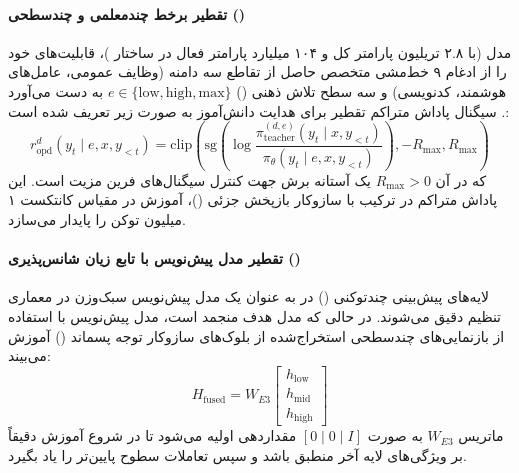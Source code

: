 \item {}

\paragraph*{تقطیر برخط چندمعلمی و چندسطحی ()}
مدل  (با ۲.۸ تریلیون پارامتر کل و ۱۰۴ میلیارد پارامتر فعال در ساختار )، قابلیت‌های خود را از ادغام ۹ خط‌مشی متخصص حاصل از تقاطع سه دامنه (وظایف عمومی، عامل‌های هوشمند، کدنویسی) و سه سطح تلاش ذهنی () $e \in \{\text{low}, \text{high}, \text{max}\}$ به دست می‌آورد \cite{kimi2026k3}. سیگنال پاداش متراکم تقطیر برای هدایت دانش‌آموز به صورت زیر تعریف شده است:
\begin{equation}
    r_{\mathrm{opd}}^d(y_t \mid e, x, y_{<t}) = \mathrm{clip}\left( \mathrm{sg}\left( \log \frac{\pi_{\text{teacher}}^{(d, e)}(y_t \mid x, y_{<t})}{\pi_\theta(y_t \mid e, x, y_{<t})} \right), -R_{\max}, R_{\max} \right)
\end{equation}
که در آن $R_{\max} > 0$ یک آستانه برش جهت کنترل سیگنال‌های فرین مزیت است. این پاداش متراکم در ترکیب با سازوکار بازپخش جزئی ()، آموزش در مقیاس کانتکست ۱ میلیون توکن را پایدار می‌سازد.

\paragraph*{تقطیر مدل پیش‌نویس  با تابع زیان شانس‌پذیری ()}
لایه‌های پیش‌بینی چندتوکنی () در  به عنوان یک مدل پیش‌نویس سبک‌وزن در معماری  \cite{li2025eagle3} تنظیم دقیق می‌شوند. در حالی که مدل هدف منجمد است، مدل پیش‌نویس با استفاده از بازنمایی‌های چندسطحی استخراج‌شده از بلوک‌های سازوکار توجه پسماند () آموزش می‌بیند:
\begin{equation}
    H_{\mathrm{fused}} = W_{E3} \begin{bmatrix} h_{\mathrm{low}} \\ h_{\mathrm{mid}} \\ h_{\mathrm{high}} \end{bmatrix}
\end{equation}
ماتریس $W_{E3}$ به صورت $[0 \mid 0 \mid I]$ مقداردهی اولیه می‌شود تا در شروع آموزش دقیقاً بر ویژگی‌های لایه آخر منطبق باشد و سپس تعاملات سطوح پایین‌تر را یاد بگیرد.

